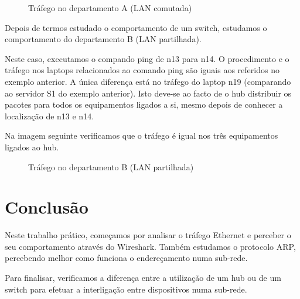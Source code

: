 \documentclass[11pt]{article}
\begin{document}
\begin{figure}[hbt!]
    \centering
    \caption{Tráfego no departamento A (LAN comutada)}
\end{figure}
\clearpage

Depois de termos estudado o comportamento de um switch, estudamos o comportamento do departamento B (LAN partilhada).

Neste caso, executamos o compando ping de n13 para n14. O procedimento e o tráfego nos laptops relacionados ao comando ping são iguais aos referidos no exemplo anterior. A única diferença está no tráfego do laptop n19 (comparando ao servidor S1 do exemplo anterior). Isto deve-se ao facto de o hub distribuir os pacotes para todos os equipamentos ligados a si, mesmo depois de conhecer a localização de n13 e n14.

Na imagem seguinte verificamos que o tráfego é igual nos três equipamentos ligados ao hub.

\begin{figure}[hbt!]
    \centering
    \caption{Tráfego no departamento B (LAN partilhada)}
\end{figure}
\clearpage

\section{Conclusão}

Neste trabalho prático, começamos por analisar o tráfego Ethernet e perceber o seu comportamento através do Wireshark. Também estudamos o protocolo ARP, percebendo melhor como funciona o endereçamento numa sub-rede.

Para finalisar, verificamos a diferença entre a utilização de um hub ou de um switch para efetuar a interligação entre dispositivos numa sub-rede.
\end{document}
